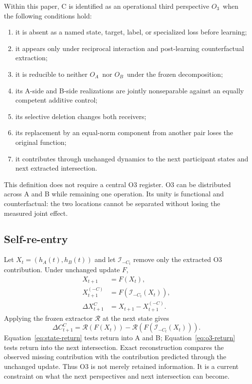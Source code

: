 \documentclass[11pt,a4paper]{article}
\newcommand{\OA}{\ensuremath{O_{A}}}
\newcommand{\OB}{\ensuremath{O_{B}}}
\newcommand{\Othree}{\ensuremath{O_{3}}}
\begin{document}
Within this paper, C is identified as an operational third perspective \Othree\ when the following conditions hold:
\begin{enumerate}
  \item it is absent as a named state, target, label, or specialized loss before learning;
  \item it appears only under reciprocal interaction and post-learning counterfactual extraction;
  \item it is reducible to neither \OA\ nor \OB\ under the frozen decomposition;
  \item its A-side and B-side realizations are jointly nonseparable against an equally competent additive control;
  \item its selective deletion changes both receivers;
  \item its replacement by an equal-norm component from another pair loses the original function;
  \item it contributes through unchanged dynamics to the next participant states and next extracted intersection.
\end{enumerate}

This definition does not require a central O3 register. O3 can be distributed across A and B while remaining one operation. Its unity is functional and counterfactual: the two locations cannot be separated without losing the measured joint effect.

\subsection{Self-re-entry}

Let $X_t=(h_A(t),h_B(t))$ and let $\mathcal I_{-C_t}$ remove only the extracted O3 contribution. Under unchanged update $F$,
\begin{align}
 X_{t+1}&=F(X_t),\\
 X_{t+1}^{(-C)}&=F(\mathcal I_{-C_t}(X_t)),\\
 \Delta X_{t+1}^{C}&=X_{t+1}-X_{t+1}^{(-C)}.
 \label{eq:state-return}
\end{align}
Applying the frozen extractor $\mathcal R$ at the next state gives
\begin{equation}
 \Delta C_{t+1}^{C}
 =\mathcal R(F(X_t))-\mathcal R(F(\mathcal I_{-C_t}(X_t))).
 \label{eq:o3-return}
\end{equation}
Equation~\eqref{eq:state-return} tests return into A and B; Equation~\eqref{eq:o3-return} tests return into the next intersection. Exact reconstruction compares the observed missing contribution with the contribution predicted through the unchanged update. Thus O3 is not merely retained information. It is a current constraint on what the next perspectives and next intersection can become.
\end{document}
